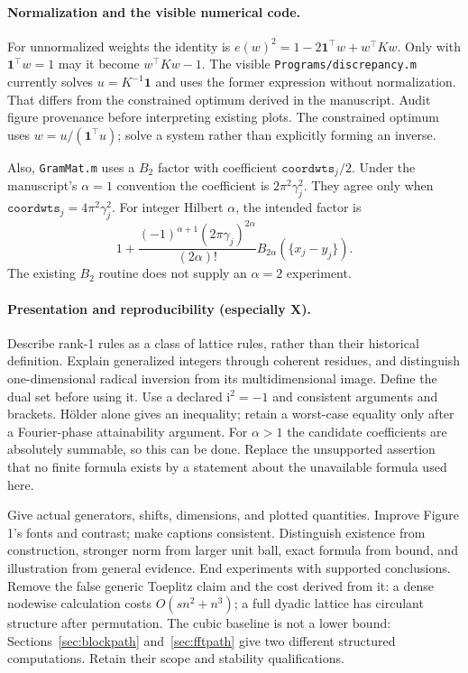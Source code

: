 \documentclass[11pt]{article}
\newcommand{\ii}{\mathrm{i}}
\newcommand{\bbone}{\boldsymbol{1}}
\begin{document}
\paragraph{Normalization and the visible numerical code.}
For unnormalized weights the identity is
$e(w)^2=1-2\bbone^\top w+w^\top Kw$.
Only with $\bbone^\top w=1$ may it become $w^\top Kw-1$.
The visible \texttt{Programs/discrepancy.m} currently solves
$u=K^{-1}\bbone$ and uses the former expression without normalization.
That differs from the constrained optimum derived in the manuscript.
Audit figure provenance before interpreting existing plots.
The constrained optimum uses $w=u/(\bbone^\top u)$;
solve a system rather than explicitly forming an inverse.

Also, \texttt{GramMat.m} uses a $B_2$ factor with coefficient
$\texttt{coordwts}_j/2$.
Under the manuscript's $\alpha=1$ convention the coefficient is
$2\pi^2\gamma_j^2$. They agree only when
$\texttt{coordwts}_j=4\pi^2\gamma_j^2$.
For integer Hilbert $\alpha$, the intended factor is
\[
 1+\frac{(-1)^{\alpha+1}(2\pi\gamma_j)^{2\alpha}}{(2\alpha)!}
 B_{2\alpha}(\{x_j-y_j\}).
\]
The existing $B_2$ routine does not supply an $\alpha=2$ experiment.

\paragraph{Presentation and reproducibility (especially X).}
Describe rank-1 rules as a class of lattice rules, rather than their
historical definition.
Explain generalized integers through coherent residues, and distinguish
one-dimensional radical inversion from its multidimensional image.
Define the dual set before using it.
Use a declared $\ii^2=-1$ and consistent arguments and brackets.
H\"older alone gives an inequality; retain a worst-case equality only
after a Fourier-phase attainability argument. For $\alpha>1$ the
candidate coefficients are absolutely summable, so this can be done.
Replace the unsupported assertion that no finite formula exists by a
statement about the unavailable formula used here.

Give actual generators, shifts, dimensions, and plotted quantities.
Improve Figure 1's fonts and contrast; make captions consistent.
Distinguish existence from construction, stronger norm from larger
unit ball, exact formula from bound, and illustration from general
evidence. End experiments with supported conclusions.
Remove the false generic Toeplitz claim and the cost derived from it:
a dense nodewise calculation costs $O(sn^2+n^3)$;
a full dyadic lattice has circulant structure after permutation.
The cubic baseline is not a lower bound: Sections~\ref{sec:blockpath}
and~\ref{sec:fftpath} give two different structured computations.
Retain their scope and stability qualifications.
\end{document}
